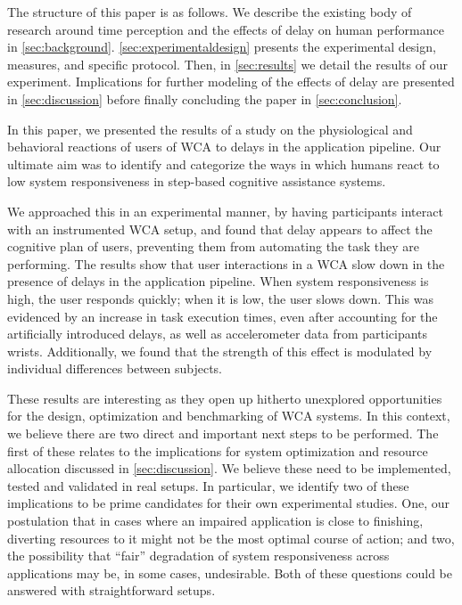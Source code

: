 The structure of this paper is as follows.
We describe the existing body of research around time perception and the effects of delay on human performance in \cref{sec:background}.
\cref{sec:experimentaldesign} presents the experimental design, measures, and specific protocol.
Then, in \cref{sec:results} we detail the results of our experiment.
Implications for further modeling of the effects of delay are presented in \cref{sec:discussion} before finally concluding the paper in \cref{sec:conclusion}.

In this paper, we presented the results of a study on the physiological and behavioral reactions of users of WCA to delays in the application pipeline.
Our ultimate aim was to identify and categorize the ways in which humans react to low system responsiveness in step-based cognitive assistance systems.

We approached this in an experimental manner, by having participants interact with an instrumented WCA setup, and found that delay appears to affect the cognitive plan of users, preventing them from automating the task they are performing.
The results show that user interactions in a WCA slow down in the presence of delays in the application pipeline.
When system responsiveness is high, the user responds quickly; when it is low, the user slows down.
This was evidenced by an increase in task execution times, even after accounting for the artificially introduced delays, as well as accelerometer data from participants wrists.
Additionally, we found that the strength of this effect is modulated by individual differences between subjects.

These results are interesting as they open up hitherto unexplored opportunities for the design, optimization and benchmarking of WCA systems.
In this context, we believe there are two direct and important next steps to be performed.
The first of these relates to the implications for system optimization and resource allocation discussed in \cref{sec:discussion}.
We believe these need to be implemented, tested and validated in real setups.
In particular, we identify two of these implications to be prime candidates for their own experimental studies.
One, our postulation that in cases where an impaired application is close to finishing, diverting resources to it might not be the most optimal course of action; and two, the possibility that ``fair'' degradation of system responsiveness across applications may be, in some cases, undesirable.
Both of these questions could be answered with straightforward setups.

